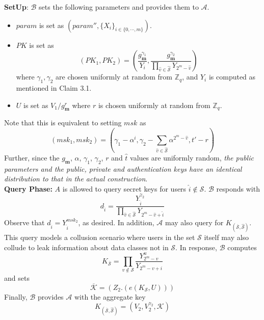 \noindent \textbf{SetUp}: $\mathcal{B}$ sets the following parameters and provides them to $\mathcal{A}$.
\begin{itemize}
  \item $param$ is set as $(param'',\{X_i\}_{i\in\{0,\cdots,m\}})\nonumber$.
  \item $PK$ is set as 
  \begin{equation}
   (PK_1,PK_2) = \left(\frac{g^{\gamma_1}_{\mathbf{m}}}{Y_i},\frac{g^{\gamma_2}_{\mathbf{m}}}{\prod_{\hat{v}\in\hat{\mathcal{S}}}Y_{2^m-\hat{v}}}\right)\nonumber
  \end{equation}
  \noindent where $\gamma_1,\gamma_2$ are chosen uniformly at random from $\mathbb{Z}_q$, and $Y_i$ is computed as mentioned in Claim 3.1. 
  \item $U$ is set as $V_1/g^{r}_{\mathbf{m}}$ where $r$ is chosen uniformly at random from $\mathbb{Z}_q$.  
\end{itemize}

\noindent Note that this is equivalent to setting $msk$ as
\begin{equation}
 (msk_1,msk_2) = \left(\gamma_1-\alpha^i,\gamma_2-\sum_{\hat{v}\in\hat{\mathcal{S}}}\alpha^{2^m-\hat{v}},t'-r\right)\nonumber
\end{equation}
\noindent Further, since the $g_{\mathbf{m}}$, $\alpha$, $\gamma_1$, $\gamma_2$, $r$ and $\hat{t}$ values are uniformly random, \emph{the public parameters and the public, private and authentication keys have an identical distribution to that in the actual construction}.\\

\noindent\textbf{Query Phase:} $A$ is allowed to query secret keys for users $\hat{i}\notin\mathcal{S}$. $\mathcal{B}$ responds with 
\begin{equation}
 d_{\hat{i}} = \frac{Y^{\gamma_2}_{\hat{i}}}{\prod_{\hat{v}\in\hat{\mathcal{S}}}Y_{2^m-\hat{v}+\hat{i}}}\nonumber
\end{equation}
\noindent Observe that $d_{\hat{i}}=Y^{msk_2}_{\hat{i}}$, as desired. In addition, $\mathcal{A}$ may also query for $K_{\left(\overline{\mathcal{S}},\hat{\mathcal{S}}\right)}$. This query models a collusion scenario where users in the set $\mathcal{S}$ itself may also collude to leak information about data classes not in $\mathcal{S}$. In response, $\mathcal{B}$ computes   
\begin{equation}
 K_{\overline{\mathcal{S}}} = \prod_{v\notin\mathcal{S}}\frac{Y^{u}_{2^m-v}}{Y_{2^m-v+i}}\nonumber
\end{equation}
\noindent and sets
\begin{equation}
 \overline{\mathcal{K}} = \left(Z_2.\left(e(K_{\mathcal{S}},U)\right)\right)\nonumber
\end{equation}
\noindent Finally, $\mathcal{B}$ provides $\mathcal{A}$ with the aggregate key 
\begin{equation} 
 K_{\left(\overline{\mathcal{S}},\hat{\mathcal{S}}\right)}=\left(V_2,V^{\gamma_2}_2,\mathcal{K}\right)\nonumber
\end{equation}

